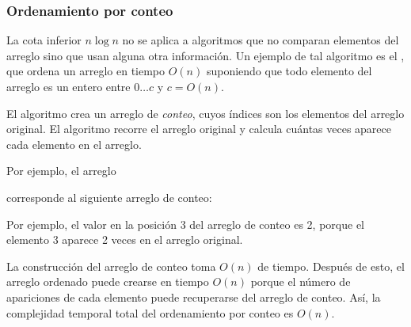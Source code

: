 \subsubsection{Ordenamiento por conteo}


La cota inferior $n \log n$ no se aplica a
algoritmos que no comparan elementos del arreglo
sino que usan alguna otra información.
Un ejemplo de tal algoritmo es
el , que ordena un arreglo en
tiempo $O(n)$ suponiendo que todo elemento del arreglo
es un entero entre $0 \ldots c$ y $c=O(n)$.

El algoritmo crea un arreglo de \emph{conteo},
cuyos índices son los elementos del arreglo original.
El algoritmo recorre el arreglo original
y calcula cuántas veces aparece cada elemento
en el arreglo.
\newpage

Por ejemplo, el arreglo
\begin{center}
\end{center}
corresponde al siguiente arreglo de conteo:
\begin{center}
\end{center}

Por ejemplo, el valor en la posición 3
del arreglo de conteo es 2,
porque el elemento 3 aparece 2 veces
en el arreglo original.

La construcción del arreglo de conteo
toma $O(n)$ de tiempo. Después de esto, el arreglo ordenado
puede crearse en tiempo $O(n)$ porque
el número de apariciones de cada elemento puede recuperarse
del arreglo de conteo.
Así, la complejidad temporal total del ordenamiento
por conteo es $O(n)$.

